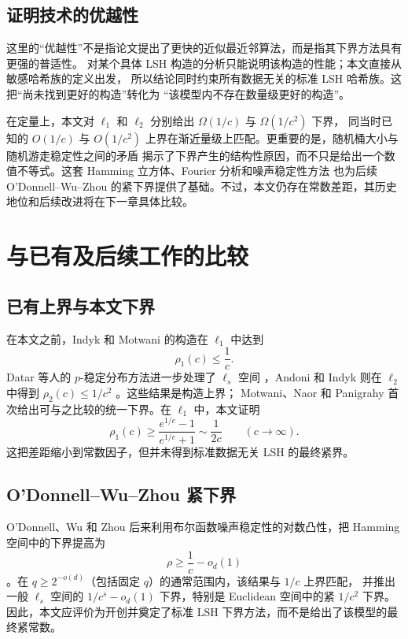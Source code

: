 \documentclass[UTF8,11pt,a4paper]{ctexart}
\begin{document}
\subsection{证明技术的优越性}

这里的“优越性”不是指论文提出了更快的近似最近邻算法，而是指其下界方法具有更强的普适性。
对某个具体 LSH 构造的分析只能说明该构造的性能；本文直接从敏感哈希族的定义出发，
所以结论同时约束所有数据无关的标准 LSH 哈希族。这把“尚未找到更好的构造”转化为
“该模型内不存在数量级更好的构造”。

在定量上，本文对 $\ell_1$ 和 $\ell_2$ 分别给出 $\Omega(1/c)$ 与 $\Omega(1/c^2)$ 下界，
同当时已知的 $O(1/c)$ 与 $O(1/c^2)$ 上界在渐近量级上匹配。更重要的是，随机桶大小与随机游走稳定性之间的矛盾
揭示了下界产生的结构性原因，而不只是给出一个数值不等式。这套 Hamming 立方体、Fourier 分析和噪声稳定性方法
也为后续 O'Donnell--Wu--Zhou 的紧下界提供了基础。不过，本文仍存在常数差距，其历史地位和后续改进将在下一章具体比较。

\section{与已有及后续工作的比较}

\subsection{已有上界与本文下界}

在本文之前，Indyk 和 Motwani 的构造在 $\ell_1$ 中达到
\[
  \rho_1(c)\le \frac{1}{c}.
\]
Datar 等人的 $p$-稳定分布方法进一步处理了 $\ell_s$ 空间 \cite{datar2004}，Andoni 和 Indyk
则在 $\ell_2$ 中得到 $\rho_2(c)\le 1/c^2$ \cite{andoni2005}。这些结果是构造上界；
Motwani、Naor 和 Panigrahy 首次给出可与之比较的统一下界。在 $\ell_1$ 中，本文证明
\[
  \rho_1(c)
  \ge
  \frac{e^{1/c}-1}{e^{1/c}+1}
  \sim
  \frac{1}{2c}
  \qquad (c\to\infty).
\]
这把差距缩小到常数因子，但并未得到标准数据无关 LSH 的最终紧界。

\subsection{O'Donnell--Wu--Zhou 紧下界}

O'Donnell、Wu 和 Zhou 后来利用布尔函数噪声稳定性的对数凸性，把 Hamming 空间中的下界提高为
\[
  \rho\ge \frac{1}{c}-o_d(1)
\]
\cite{odonnell2011}。在 $q\ge 2^{-o(d)}$（包括固定 $q$）的通常范围内，该结果与 $1/c$ 上界匹配，
并推出一般 $\ell_s$ 空间的 $1/c^s-o_d(1)$ 下界，特别是 Euclidean 空间中的紧 $1/c^2$ 下界。
因此，本文应评价为开创并奠定了标准 LSH 下界方法，而不是给出了该模型的最终紧常数。
\end{document}

